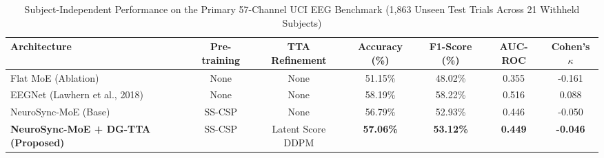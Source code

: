 \begin{table}[t]
\centering
\caption{Subject-Independent Performance on the Primary 57-Channel UCI EEG Benchmark (1,863 Unseen Test Trials Across 21 Withheld Subjects)}
\label{tab:primary_benchmark}
\begin{tabular}{lcccccc}
\hline
\textbf{Architecture} & \textbf{Pre-training} & \textbf{TTA Refinement} & \textbf{Accuracy (\%)} & \textbf{F1-Score (\%)} & \textbf{AUC-ROC} & \textbf{Cohen's $\kappa$} \\
\hline
Flat MoE (Ablation) & None & None & 51.15\% & 48.02\% & 0.355 & -0.161 \\
EEGNet (Lawhern et al., 2018) & None & None & 58.19\% & 58.22\% & 0.516 & 0.088 \\
NeuroSync-MoE (Base) & SS-CSP & None & 56.79\% & 52.93\% & 0.446 & -0.050 \\
\textbf{NeuroSync-MoE + DG-TTA (Proposed)} & SS-CSP & Latent Score DDPM & \textbf{57.06\%} & \textbf{53.12\%} & \textbf{0.449} & \textbf{-0.046} \\
\hline
\end{tabular}
\end{table}